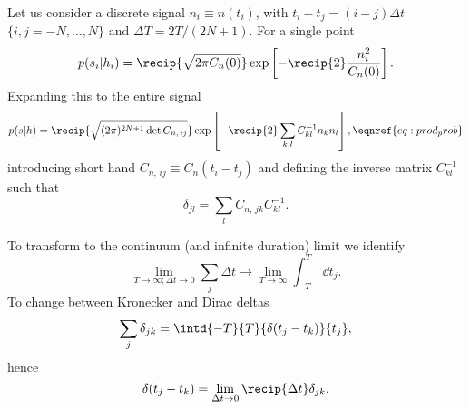 Let us consider a discrete signal $n_i \equiv n(t_i)$, with $t_i - t_j = (i - j)\Delta t$ $\{i,j = -N, \ldots, N\}$ and $\Delta T = 2T/(2N + 1)$. For a single point
\begin{equation}
p(s_i|h_i) = \recip{\sqrt{2\pi C_n(0)}} \exp\left[-\recip{2} \frac{n_i^2}{C_n(0)}\right].
\end{equation}
Expanding this to the entire signal
\begin{equation}
p(s|h) = \recip{\sqrt{(2\pi)^{2N+1} \det C_{n,\,ij}}} \exp\left[-\recip{2} \sum_{k,l}C^{-1}_{kl}n_k n_l\right],
\eqnref{eq:prod_prob}
\end{equation}
introducing short hand $C_{n,\,ij} \equiv C_n(t_i - t_j)$ and defining the inverse matrix $C^{-1}_{kl}$ such that
\begin{equation}
\delta_{jl} = \sum_l C_{n,\,jk}C^{-1}_{kl}.
\end{equation}

To transform to the continuum (and infinite duration) limit we identify
\begin{equation}
\lim_{T \rightarrow \infty; \Delta t \rightarrow 0} \sum_j \Delta t \rightarrow \lim_{T \rightarrow \infty} \int_{-T}^{T}\,\dd t_j.
\end{equation}
To change between Kronecker and Dirac deltas
\begin{equation}
\sum_j \delta_{jk} = \intd{-T}{T}{\delta(t_j - t_k)}{t_j},
\end{equation}
hence
\begin{equation}
\delta(t_j - t_k) = \lim_{\Delta t \rightarrow 0} \recip{\Delta t} \delta_{jk}.
\end{equation}

